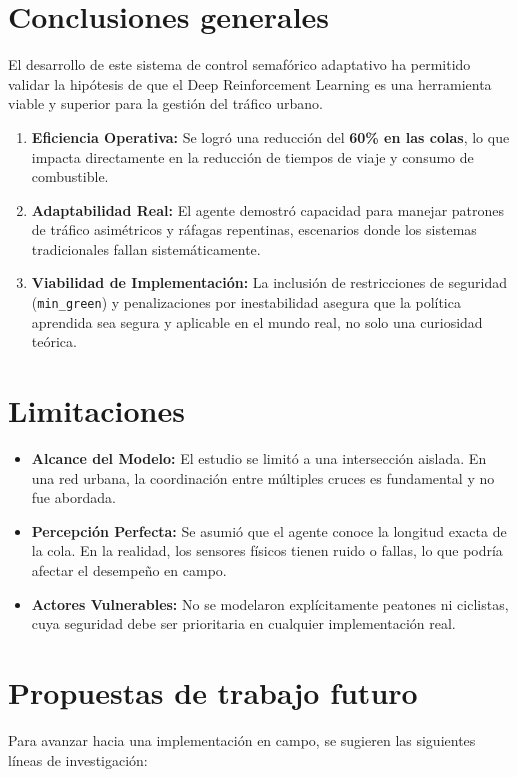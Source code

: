 \section{Conclusiones generales}
El desarrollo de este sistema de control semafórico adaptativo ha permitido validar la hipótesis de que el Deep Reinforcement Learning es una herramienta viable y superior para la gestión del tráfico urbano.

\begin{enumerate}
    \item \textbf{Eficiencia Operativa:} Se logró una reducción del \textbf{60\% en las colas}, lo que impacta directamente en la reducción de tiempos de viaje y consumo de combustible.
    \item \textbf{Adaptabilidad Real:} El agente demostró capacidad para manejar patrones de tráfico asimétricos y ráfagas repentinas, escenarios donde los sistemas tradicionales fallan sistemáticamente.
    \item \textbf{Viabilidad de Implementación:} La inclusión de restricciones de seguridad (\texttt{min\_green}) y penalizaciones por inestabilidad asegura que la política aprendida sea segura y aplicable en el mundo real, no solo una curiosidad teórica.
\end{enumerate}

\section{Limitaciones}
\begin{itemize}
    \item \textbf{Alcance del Modelo:} El estudio se limitó a una intersección aislada. En una red urbana, la coordinación entre múltiples cruces es fundamental y no fue abordada.
    \item \textbf{Percepción Perfecta:} Se asumió que el agente conoce la longitud exacta de la cola. En la realidad, los sensores físicos tienen ruido o fallas, lo que podría afectar el desempeño en campo.
    \item \textbf{Actores Vulnerables:} No se modelaron explícitamente peatones ni ciclistas, cuya seguridad debe ser prioritaria en cualquier implementación real.
\end{itemize}

\section{Propuestas de trabajo futuro}
Para avanzar hacia una implementación en campo, se sugieren las siguientes líneas de investigación:

